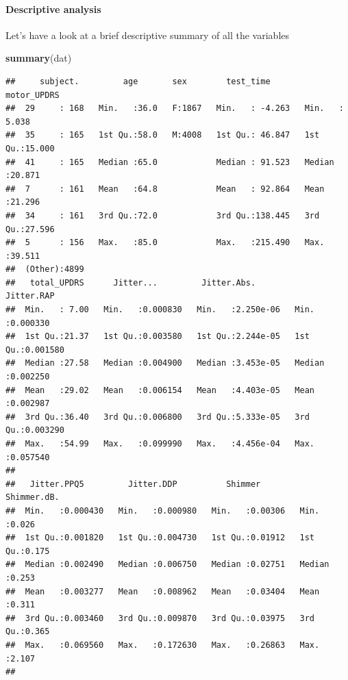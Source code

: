 \documentclass[
]{article}
\newenvironment{Shaded}{\begin{snugshade}}{\end{snugshade}}
\newcommand{\FunctionTok}[1]{\textcolor[rgb]{0.13,0.29,0.53}{\textbf{#1}}}
\newcommand{\NormalTok}[1]{#1}
\begin{document}
\hypertarget{descriptive-analysis}{%
\paragraph{Descriptive analysis}\label{descriptive-analysis}}

Let's have a look at a brief descriptive summary of all the variables

\begin{Shaded}
\begin{Highlighting}[]
\FunctionTok{summary}\NormalTok{(dat)}
\end{Highlighting}
\end{Shaded}

\begin{verbatim}
##     subject.         age       sex        test_time        motor_UPDRS    
##  29     : 168   Min.   :36.0   F:1867   Min.   : -4.263   Min.   : 5.038  
##  35     : 165   1st Qu.:58.0   M:4008   1st Qu.: 46.847   1st Qu.:15.000  
##  41     : 165   Median :65.0            Median : 91.523   Median :20.871  
##  7      : 161   Mean   :64.8            Mean   : 92.864   Mean   :21.296  
##  34     : 161   3rd Qu.:72.0            3rd Qu.:138.445   3rd Qu.:27.596  
##  5      : 156   Max.   :85.0            Max.   :215.490   Max.   :39.511  
##  (Other):4899                                                             
##   total_UPDRS      Jitter...         Jitter.Abs.          Jitter.RAP      
##  Min.   : 7.00   Min.   :0.000830   Min.   :2.250e-06   Min.   :0.000330  
##  1st Qu.:21.37   1st Qu.:0.003580   1st Qu.:2.244e-05   1st Qu.:0.001580  
##  Median :27.58   Median :0.004900   Median :3.453e-05   Median :0.002250  
##  Mean   :29.02   Mean   :0.006154   Mean   :4.403e-05   Mean   :0.002987  
##  3rd Qu.:36.40   3rd Qu.:0.006800   3rd Qu.:5.333e-05   3rd Qu.:0.003290  
##  Max.   :54.99   Max.   :0.099990   Max.   :4.456e-04   Max.   :0.057540  
##                                                                           
##   Jitter.PPQ5         Jitter.DDP          Shimmer         Shimmer.dB.   
##  Min.   :0.000430   Min.   :0.000980   Min.   :0.00306   Min.   :0.026  
##  1st Qu.:0.001820   1st Qu.:0.004730   1st Qu.:0.01912   1st Qu.:0.175  
##  Median :0.002490   Median :0.006750   Median :0.02751   Median :0.253  
##  Mean   :0.003277   Mean   :0.008962   Mean   :0.03404   Mean   :0.311  
##  3rd Qu.:0.003460   3rd Qu.:0.009870   3rd Qu.:0.03975   3rd Qu.:0.365  
##  Max.   :0.069560   Max.   :0.172630   Max.   :0.26863   Max.   :2.107  
##                                                                         

\end{verbatim}
\end{document}

